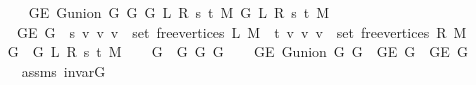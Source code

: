 \begin{isabellebody}
\ \ \isanewline
\ \ \ \ {\isachardoublequoteopen}G{\isachardot}{\kern0pt}E\ {\isacharparenleft}{\kern0pt}G{\isachardot}{\kern0pt}union\ {\isacharparenleft}{\kern0pt}G{}\ G\ {\isacharparenleft}{\kern0pt}G{}\ L\ R\ s\ t\ M{\isacharparenright}{\kern0pt}{\isacharparenright}{\kern0pt}\ {\isacharparenleft}{\kern0pt}G{}\ L\ R\ s\ t\ M{\isacharparenright}{\kern0pt}{\isacharparenright}{\kern0pt}\ {\isacharequal}{\kern0pt}\isanewline
\ \ \ \ \ G{\isachardot}{\kern0pt}E\ G\ {\isasymunion}\ {\isacharbraceleft}{\kern0pt}{\isacharbraceleft}{\kern0pt}s{\isacharcomma}{\kern0pt}\ v{\isacharbraceright}{\kern0pt}\ {\isacharbar}{\kern0pt}v{\isachardot}{\kern0pt}\ v\ {\isasymin}\ set\ {\isacharparenleft}{\kern0pt}free{\isacharunderscore}{\kern0pt}vertices\ L\ M{\isacharparenright}{\kern0pt}{\isacharbraceright}{\kern0pt}\ {\isasymunion}\ {\isacharbraceleft}{\kern0pt}{\isacharbraceleft}{\kern0pt}t{\isacharcomma}{\kern0pt}\ v{\isacharbraceright}{\kern0pt}\ {\isacharbar}{\kern0pt}v{\isachardot}{\kern0pt}\ v\ {\isasymin}\ set\ {\isacharparenleft}{\kern0pt}free{\isacharunderscore}{\kern0pt}vertices\ R\ M{\isacharparenright}{\kern0pt}{\isacharbraceright}{\kern0pt}{\isachardoublequoteclose}%
\endisataginvisible
{\isafoldinvisible}%
%
\isadeliminvisible
\isanewline
%
\endisadeliminvisible
%
\isadelimproof
%
\endisadelimproof
%
\isatagproof
{}\isamarkupfalse%
\ {\isacharminus}{\kern0pt}\isanewline
\ \ \isamarkupfalse%
\ {\isacharquery}{\kern0pt}G{}\ {\isacharequal}{\kern0pt}\ {\isachardoublequoteopen}G{}\ L\ R\ s\ t\ M{\isachardoublequoteclose}\isanewline
\ \ \isamarkupfalse%
\ {\isacharquery}{\kern0pt}G{}\ {\isacharequal}{\kern0pt}\ {\isachardoublequoteopen}G{}\ G\ {\isacharquery}{\kern0pt}G{}{\isachardoublequoteclose}\isanewline
\ \ \isamarkupfalse%
\ {\isachardoublequoteopen}G{\isachardot}{\kern0pt}E\ {\isacharparenleft}{\kern0pt}G{\isachardot}{\kern0pt}union\ {\isacharquery}{\kern0pt}G{}\ {\isacharquery}{\kern0pt}G{}{\isacharparenright}{\kern0pt}\ {\isacharequal}{\kern0pt}\ G{\isachardot}{\kern0pt}E\ {\isacharquery}{\kern0pt}G{}\ {\isasymunion}\ G{\isachardot}{\kern0pt}E\ {\isacharquery}{\kern0pt}G{}{\isachardoublequoteclose}\isanewline
\ \ \ \ \isamarkupfalse%
\ assms{\isacharparenleft}{\kern0pt}{}{\isacharparenright}{\kern0pt}\ invar{\isacharunderscore}{\kern0pt}G{}\isanewline
\ \ \ \ \isamarkupfalse%

\end{isabellebody}
